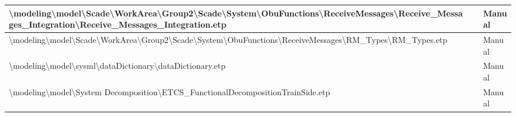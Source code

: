 \begin{longtable}{|>{\RaggedRight}p{}|>{\RaggedRight}p{}|>{\RaggedRight}p{}|}
\hline
\textbackslash modeling\textbackslash \allowbreak model\textbackslash \allowbreak Scade\textbackslash \allowbreak WorkArea\textbackslash \allowbreak Group2\textbackslash \allowbreak Scade\textbackslash \allowbreak System\textbackslash \allowbreak ObuFunctions\textbackslash \allowbreak ReceiveMessages\textbackslash \allowbreak Receive\_\allowbreak Messages\_\allowbreak Integration\textbackslash \allowbreak Receive\_\allowbreak Messages\_\allowbreak Integration.etp& &Manual\\
\hline
\textbackslash modeling\textbackslash \allowbreak model\textbackslash \allowbreak Scade\textbackslash \allowbreak WorkArea\textbackslash \allowbreak Group2\textbackslash \allowbreak Scade\textbackslash \allowbreak System\textbackslash \allowbreak ObuFunctions\textbackslash \allowbreak ReceiveMessages\textbackslash \allowbreak RM\_\allowbreak Types\textbackslash \allowbreak RM\_\allowbreak Types.etp& &Manual\\
\hline
\textbackslash modeling\textbackslash \allowbreak model\textbackslash \allowbreak sysml\textbackslash \allowbreak dataDictionary\textbackslash \allowbreak dataDictionary.etp& &Manual\\
\hline
\textbackslash modeling\textbackslash \allowbreak model\textbackslash \allowbreak System Decomposition\textbackslash \allowbreak ETCS\_\allowbreak FunctionalDecompositionTrainSide.etp& &Manual\\
\hline
\end{longtable}
